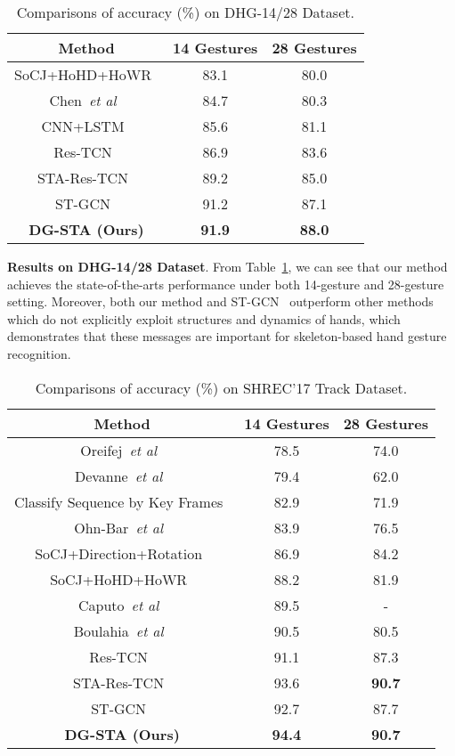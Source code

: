 \documentclass{bmvc2k}
\def\etal{\emph{et al}\bmvaOneDot}
\begin{document}
\begin{table}[h]
\begin{center}
\begin{tabular}{|c|c|c|}
\hline
Method & 14 Gestures & 28 Gestures\\
\hline\hline
SoCJ+HoHD+HoWR~\cite{de2016skeleton} & 83.1 & 80.0\\
Chen~\etal~\cite{chen2017motion} & 84.7 & 80.3\\
CNN+LSTM~\cite{nunez2018convolutional} & 85.6 & 81.1\\
Res-TCN~\cite{hou2018spatial} & 86.9 & 83.6\\
STA-Res-TCN~\cite{hou2018spatial} & 89.2 & 85.0\\
ST-GCN~\cite{yan2018spatial} & 91.2 & 87.1\\
\hline\hline
\textbf{DG-STA (Ours)} & \textbf{91.9} & \textbf{88.0}\\
\hline
\end{tabular}
\end{center}
\caption{Comparisons of accuracy (\%) on DHG-14/28 Dataset.}
\label{tbl:dhg}
\end{table}

\textbf{Results on DHG-14/28 Dataset}. From Table~\ref{tbl:dhg}, we can see that our method achieves the state-of-the-arts performance under both 14-gesture and 28-gesture setting. Moreover, both our method and ST-GCN~\cite{yan2018spatial} outperform other methods which do not explicitly exploit structures and dynamics of hands, which demonstrates that these messages are important for skeleton-based hand gesture recognition.

\begin{table}[h]
\begin{center}
\begin{tabular}{|c|c|c|}
\hline
Method & 14 Gestures & 28 Gestures\\
\hline\hline
Oreifej~\etal~\cite{oreifej2013hon4d} & 78.5 & 74.0\\
Devanne~\etal~\cite{devanne20153} & 79.4 & 62.0\\
Classify Sequence by Key Frames~\cite{de2017shrec} & 82.9 & 71.9\\
Ohn-Bar~\etal~\cite{ohn2013joint} & 83.9 & 76.5\\
SoCJ+Direction+Rotation~\cite{de2017dynamic} & 86.9 & 84.2\\
SoCJ+HoHD+HoWR~\cite{de2016skeleton} & 88.2 & 81.9\\
Caputo~\etal~\cite{caputo2018comparing} & 89.5 & -\\
Boulahia~\etal~\cite{boulahia2017dynamic} & 90.5 & 80.5\\
Res-TCN~\cite{hou2018spatial} & 91.1 & 87.3\\
STA-Res-TCN~\cite{hou2018spatial} & 93.6 & \textbf{90.7}\\
ST-GCN~\cite{yan2018spatial} & 92.7 & 87.7\\
\hline\hline
\textbf{DG-STA (Ours)} & \textbf{94.4} & \textbf{90.7}\\
\hline
\end{tabular}
\end{center}
\caption{Comparisons of accuracy (\%) on SHREC'17 Track Dataset.}
\label{tbl:SH17}
\end{table}
\end{document}
